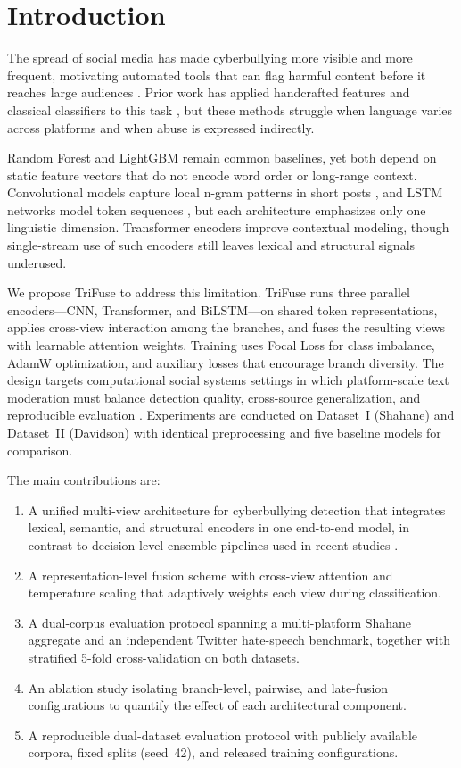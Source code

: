 \section{Introduction}

The spread of social media has made cyberbullying more visible and more frequent, motivating automated tools that can flag harmful content before it reaches large audiences \cite{ref1}. Prior work has applied handcrafted features and classical classifiers to this task \cite{ref2, ref3, ref4}, but these methods struggle when language varies across platforms and when abuse is expressed indirectly.

Random Forest \cite{ref5} and LightGBM \cite{ref6} remain common baselines, yet both depend on static feature vectors that do not encode word order or long-range context. Convolutional models capture local n-gram patterns in short posts \cite{ref7}, and LSTM networks model token sequences \cite{ref8}, but each architecture emphasizes only one linguistic dimension. Transformer encoders \cite{ref9} improve contextual modeling, though single-stream use of such encoders still leaves lexical and structural signals underused.

We propose TriFuse to address this limitation. TriFuse runs three parallel encoders---CNN, Transformer, and BiLSTM---on shared token representations, applies cross-view interaction among the branches, and fuses the resulting views with learnable attention weights. Training uses Focal Loss for class imbalance, AdamW optimization, and auxiliary losses that encourage branch diversity. The design targets computational social systems settings in which platform-scale text moderation must balance detection quality, cross-source generalization, and reproducible evaluation \cite{ref12, ref21}. Experiments are conducted on Dataset~I (Shahane) \cite{ref10} and Dataset~II (Davidson) \cite{ref11} with identical preprocessing and five baseline models for comparison.

The main contributions are:
\begin{enumerate}
\item A unified multi-view architecture for cyberbullying detection that integrates lexical, semantic, and structural encoders in one end-to-end model, in contrast to decision-level ensemble pipelines used in recent studies \cite{ref14, ref15}.
\item A representation-level fusion scheme with cross-view attention and temperature scaling that adaptively weights each view during classification.
\item A dual-corpus evaluation protocol spanning a multi-platform Shahane aggregate and an independent Twitter hate-speech benchmark, together with stratified 5-fold cross-validation on both datasets.
\item An ablation study isolating branch-level, pairwise, and late-fusion configurations to quantify the effect of each architectural component.
\item A reproducible dual-dataset evaluation protocol with publicly available corpora, fixed splits (seed~42), and released training configurations.
\end{enumerate}

